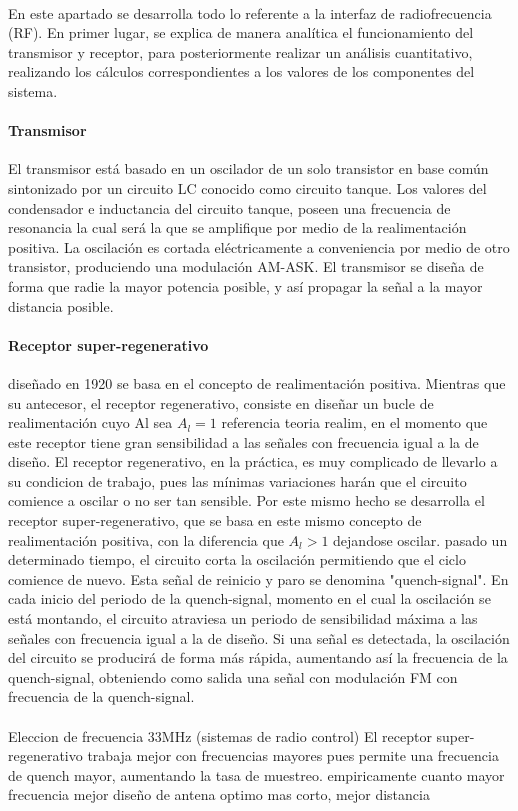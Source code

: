 \paragraph{} En este apartado se desarrolla todo lo referente a la interfaz de radiofrecuencia (RF). En primer lugar, se explica de manera analítica el funcionamiento del transmisor y receptor, para posteriormente realizar un análisis cuantitativo, realizando los cálculos correspondientes a los valores de los componentes del sistema.

\paragraph{Transmisor} El transmisor está basado en un oscilador de un solo transistor en base com\'un sintonizado por un circuito LC conocido como circuito tanque.
Los valores del condensador e inductancia del circuito tanque, poseen una frecuencia de resonancia la cual será la que se amplifique por medio de la realimentación positiva. La oscilación es cortada eléctricamente a conveniencia por medio de otro transistor, produciendo una modulación AM-ASK. El transmisor se diseña de forma que radie la mayor potencia posible, y así propagar la señal a la mayor distancia posible.

\paragraph{Receptor super-regenerativo} diseñado en 1920 se basa en el concepto de realimentación positiva. Mientras que su antecesor, el receptor regenerativo, consiste en diseñar un bucle de realimentación cuyo Al sea $A_l = 1$ referencia teoria realim, en el momento que este receptor tiene gran sensibilidad a las señales con frecuencia igual a la de diseño. El receptor regenerativo, en la práctica, es muy complicado de llevarlo a su condicion de trabajo, pues las mínimas variaciones harán que el circuito comience a oscilar o no ser tan sensible. Por este mismo hecho se desarrolla el receptor super-regenerativo, que se basa en este mismo concepto de realimentación positiva, con la diferencia que $A_l > 1$ dejandose oscilar. pasado un determinado tiempo, el circuito corta la oscilación permitiendo que el ciclo comience de nuevo. Esta señal de reinicio y paro se denomina "quench-signal". En cada inicio del periodo de la quench-signal, momento en el cual la oscilación se está montando, el circuito atraviesa un periodo de sensibilidad máxima a las señales con frecuencia igual a la de diseño. Si una señal es detectada, la oscilación del circuito se producirá de forma más rápida, aumentando así la frecuencia de la quench-signal, obteniendo como salida una señal con modulación FM con frecuencia de la quench-signal.

\paragraph{} Eleccion de frecuencia 33MHz (sistemas de radio control) El receptor super-regenerativo trabaja mejor con frecuencias mayores pues permite una frecuencia de quench mayor, aumentando la tasa de muestreo. empiricamente cuanto mayor frecuencia mejor diseño de antena optimo mas corto, mejor distancia 
